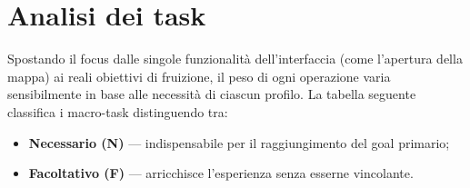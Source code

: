 \section{Analisi dei task}

Spostando il focus dalle singole funzionalità dell'interfaccia (come l'apertura della mappa) ai reali obiettivi di fruizione, il peso di ogni operazione varia sensibilmente in base alle necessità di ciascun profilo. La tabella seguente classifica i macro-task distinguendo tra:
\begin{itemize}[nosep, leftmargin=1.2em]
    \item[\textcolor{culturiaRed}{\textbullet}] \textbf{Necessario (N)} — indispensabile per il raggiungimento del goal primario;
    \item[\textcolor{culturiaRed}{\textbullet}] \textbf{Facoltativo (F)} — arricchisce l'esperienza senza esserne vincolante.
\end{itemize}

\renewcommand{\arraystretch}{1.25}

